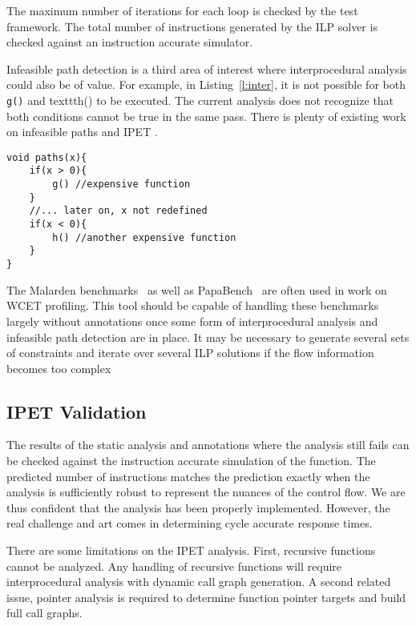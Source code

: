 The maximum number of iterations for each loop is checked by the test framework. The total number of instructions generated by the ILP solver is checked against an instruction accurate simulator. 

Infeasible path detection is a third area of interest where interprocedural analysis could also be of value. For example, in Listing~\ref{l:inter}, it is not possible for both \texttt{g()} and texttt{h()} to be executed. The current analysis does not recognize that both conditions cannot be true in the same pass. There is plenty of existing work on infeasible paths and IPET \cite{gustafsson2006automatic,suhendra2006efficient}.


\begin{lstlisting}[caption={Infeasible path analysis is required to further tighten the WCET estimates.},label={l:inter}]
void paths(x){
	if(x > 0){
		g() //expensive function
	}
	//... later on, x not redefined
	if(x < 0){
		h() //another expensive function
	}
}
\end{lstlisting}


The Malarden benchmarks~\cite{gustafsson2010malardalen} as well as PapaBench~\cite{nemer2006papabench} are often used in work on WCET profiling. This tool should be capable of handling these benchmarks largely without annotations once some form of interprocedural analysis and infeasible path detection are in place. It may be necessary to generate several sets of constraints and iterate over several ILP solutions if the flow information becomes too complex 




\subsection{IPET Validation}

The results of the static analysis and annotations where the analysis still fails can be checked against the instruction accurate simulation of the function. The predicted number of instructions matches the prediction exactly when the analysis is sufficiently robust to represent the nuances of the control flow. We are thus confident that the analysis has been properly implemented. However, the real challenge and art comes in determining cycle accurate response times.

There are some limitations on the IPET analysis. First, recursive functions cannot be analyzed. Any handling of recursive functions will require interprocedural analysis with dynamic call graph generation. A second related issue, pointer analysis is required to determine function pointer targets and build full call graphs. 



